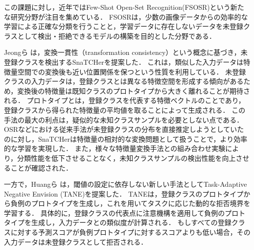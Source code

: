 \documentclass[a4paper,11pt,nomag]{jsreport}
\begin{document}

この課題に対し，近年ではFew-Shot Open-Set Recognition(FSOSR)という新たな研究分野が注目を集めている．
FSOSRは，少数の画像データからの効率的な学習による正確な分類を行うことと，学習データに存在しないデータを未登録クラスとして検出・拒絶できるモデルの構築を目的とした分野である\cite{peeler}．

Jeongら \cite{snatcher}は，変換一貫性（transformation consistency）という概念に基づき，未登録クラスを検出するSnaTCHerを提案した．
これは，類似した入力データは特徴量空間での変換後も近い位置関係を保つという性質を利用している．
未登録クラスの入力データは，登録クラスとは異なる特徴空間を形成する傾向があるため，変換後の特徴量は既知クラスのプロトタイプから大きく離れることが期待される．
プロトタイプとは，登録クラスを代表する特徴ベクトルのことであり，登録クラスから得られた特徴量の平均値を取ることによって生成される．
この手法の最大の利点は，疑似的な未知クラスサンプルを必要としない点である．
OSRなどにおける従来手法が未登録クラスの分布を直接推定しようとしていたのに対し，SnaTCHerは特徴量の相対的な変換問題として扱うことで，より効率的な学習を実現した．
また，様々な特徴量変換手法との組み合わせ実験により，分類性能を低下させることなく，未知クラスサンプルの検出性能を向上させることが確認された．

一方で，Huangら \cite{tane}は，閾値の設定に依存しない新しい手法としてTask-Adaptive Negative Envision (TANE)を提案した．
TANEは，登録クラスのプロトタイプから負例のプロトタイプを生成し，これを用いてタスクに応じた動的な拒否境界を学習する．
具体的に，登録クラスの代表点に注意機構を適用して負例のプロトタイプを生成し，入力データとの類似度が計算される．
もしすべての登録クラスに対する予測スコアが負例プロトタイプに対するスコアよりも低い場合，その入力データは未登録クラスとして拒否される．
\end{document}
